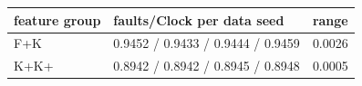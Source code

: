 \begin{tabular}{lll}
\toprule
feature group & faults/Clock per data seed & range \\
\midrule
F+K & 0.9452 / 0.9433 / 0.9444 / 0.9459 & 0.0026 \\
K+K+ & 0.8942 / 0.8942 / 0.8945 / 0.8948 & 0.0005 \\
\bottomrule
\end{tabular}
